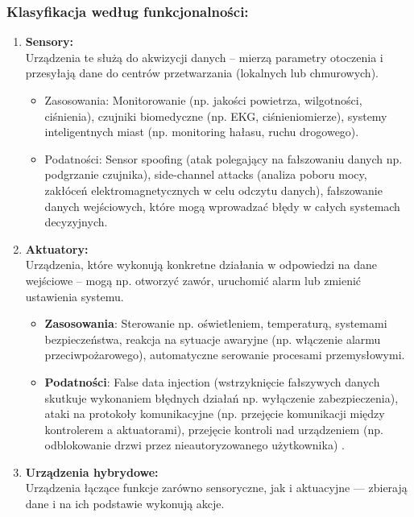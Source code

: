 \subsubsection{Klasyfikacja według funkcjonalności:}
    \begin{enumerate}
        \item \textbf{Sensory:} \\
        Urządzenia te służą do akwizycji danych – mierzą parametry otoczenia i przesyłają dane do centrów przetwarzania (lokalnych lub chmurowych).
        \begin{itemize}
            \item Zasosowania: Monitorowanie (np. jakości powietrza, wilgotności, ciśnienia), czujniki biomedyczne (np. EKG, ciśnieniomierze), systemy inteligentnych miast (np. monitoring hałasu, ruchu drogowego). 
            \item Podatności: Sensor spoofing (atak polegający na fałszowaniu danych np. podgrzanie czujnika), side-channel attacks (analiza poboru mocy, zakłóceń elektromagnetycznych w celu odczytu danych), fałszowanie danych wejściowych, które mogą wprowadzać błędy w całych systemach decyzyjnych.
        \end{itemize}
        \item \textbf{Aktuatory:} \\
        Urządzenia, które wykonują konkretne działania w odpowiedzi na dane wejściowe – mogą np. otworzyć zawór, uruchomić alarm lub zmienić ustawienia systemu.
        \begin{itemize}
            \item \textbf{Zasosowania}: Sterowanie np. oświetleniem, temperaturą, systemami bezpieczeństwa, reakcja na sytuacje awaryjne (np. włączenie alarmu przeciwpożarowego), automatyczne serowanie procesami przemysłowymi.
            \item \textbf{Podatności}: False data injection (wstrzyknięcie fałszywych danych skutkuje wykonaniem błędnych działań np. wyłączenie zabezpieczenia), ataki na protokoły komunikacyjne (np. przejęcie komunikacji między kontrolerem a aktuatorami), przejęcie kontroli nad urządzeniem (np. odblokowanie drzwi przez nieautoryzowanego użytkownika) \cite{antonakakis2017mirai}.
        \end{itemize}
        \item \textbf{Urządzenia hybrydowe:} \\
        Urządzenia łączące funkcje zarówno sensoryczne, jak i aktuacyjne — zbierają dane i na ich podstawie wykonują akcje.

\end{enumerate}
